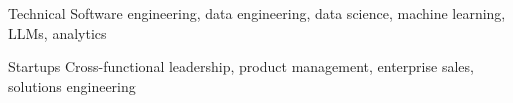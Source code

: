 

\begin{cvskills}

  \cvskill
    {Technical}
    {Software engineering, data engineering, data science, machine learning, LLMs, analytics}

  \cvskill
    {Startups}
    {Cross-functional leadership, product management, enterprise sales, solutions engineering}

\end{cvskills}
